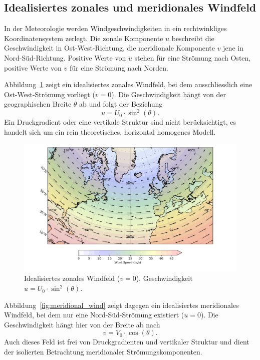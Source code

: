 
\subsection{Idealisiertes zonales und meridionales Windfeld}

In der Meteorologie werden Windgeschwindigkeiten in ein rechtwinkliges Koordinatensystem zerlegt. 
Die {zonal}e Komponente \(u\) beschreibt die Geschwindigkeit in Ost-West-Richtung, 
die {meridional}e Komponente \(v\) jene in Nord-Süd-Richtung. 
Positive Werte von \(u\) stehen für eine Strömung nach Osten, positive Werte von \(v\) für eine Strömung nach Norden.


Abbildung~\ref{fig:zonal_wind} zeigt ein idealisiertes zonales Windfeld, bei
dem ausschliesslich eine Ost-West-Strömung vorliegt (\(v = 0\)). Die
Geschwindigkeit hängt von der geographischen Breite \(\theta\) ab und folgt der
Beziehung
\begin{equation}
	u = U_0 \cdot \sin^2(\theta).
	\label{rossby:eq:zonal_wind}
\end{equation}
Ein Druckgradient oder eine vertikale Struktur sind nicht berücksichtigt, es handelt sich um ein rein theoretisches, horizontal homogenes Modell.

\begin{figure}
	\centering
	\includegraphics[width=\textwidth, trim=1cm 0cm 2cm 0cm, clip]{papers/rossby/images/zonal_wind_plot.pdf}
	\caption{Idealisiertes zonales Windfeld (\(v=0\)), Geschwindigkeit \(u = U_0 \cdot \sin^2(\theta)\).}
	\label{fig:zonal_wind}
\end{figure}

\noindent
Abbildung~\ref{fig:meridional_wind} zeigt dagegen ein idealisiertes meridionales Windfeld, bei dem nur eine Nord-Süd-Strömung existiert (\(u = 0\)).
Die Geschwindigkeit hängt hier von der Breite ab nach
\begin{equation}
	v = V_0 \cdot \cos(\theta).
	\label{rossby:eq:meridional_wind}
\end{equation}
Auch dieses Feld ist frei von Druckgradienten und vertikaler Struktur und dient der isolierten Betrachtung meridionaler Strömungskomponenten.

